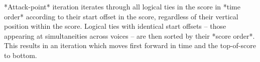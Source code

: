 *Attack-point* iteration iterates through all logical ties in the score in
*time order* according to their start offset in the score, regardless of their
vertical position within the score. Logical ties with identical start offsets
-- those appearing at simultaneities across voices -- are then sorted by their
*score order*. This results in an iteration which moves first forward in time
and the top-of-score to bottom.

\begin{comment}
<abjad>[stylesheet=../consort.ily]
music_specifier = consort.MusicSpecifier(
    attachment_handler=consort.AttachmentHandler(),
    rhythm_maker=rhythmmakertools.TaleaRhythmMaker(
        extra_counts_per_division=(0, 1),
        talea=rhythmmakertools.Talea([2, 3, 2, 4], 16),
        ),
    )
timespan_maker = consort.TaleaTimespanMaker(
    initial_silence_talea=rhythmmakertools.Talea([0, 1], 4),
    playing_groupings=(1, 2, 2, 1, 2),
    playing_talea=rhythmmakertools.Talea([2, 3], 8),
    silence_talea=rhythmmakertools.Talea([1, 2, 3, 4], 8),
    )
music_setting = consort.MusicSetting(
    timespan_maker=timespan_maker,
    v1=music_specifier,
    v2=music_specifier,
    )
segment_maker = consort.SegmentMaker(
    desired_duration_in_seconds=8,
    discard_final_silence=True,
    permitted_time_signatures=[(2, 4), (5, 16), (3, 4)],
    score_template=templatetools.GroupedRhythmicStavesScoreTemplate(
        staff_count=2,
        with_clefs=True,
        ),
    settings=[music_setting],
    tempo=indicatortools.Tempo((1, 4), 72),
    )
illustration = segment_maker(annotate=True, verbose=False)
show(illustration)
</abjad>
\end{comment}

